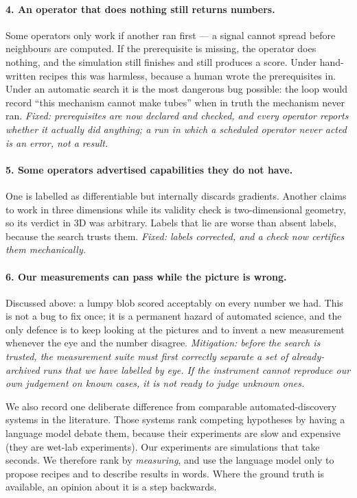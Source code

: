 \documentclass[11pt]{article}
\begin{document}
\paragraph{4. An operator that does nothing still returns numbers.}
Some operators only work if another ran first --- a signal cannot spread before neighbours are
computed. If the prerequisite is missing, the operator does nothing, and the simulation still
finishes and still produces a score. Under hand-written recipes this was harmless, because a
human wrote the prerequisites in. Under an automatic search it is the most dangerous bug
possible: the loop would record ``this mechanism cannot make tubes'' when in truth the mechanism
never ran. \emph{Fixed: prerequisites are now declared and checked, and every operator reports
whether it actually did anything; a run in which a scheduled operator never acted is an error,
not a result.}

\paragraph{5. Some operators advertised capabilities they do not have.}
One is labelled as differentiable but internally discards gradients. Another claims to work in
three dimensions while its validity check is two-dimensional geometry, so its verdict in 3D was
arbitrary. Labels that lie are worse than absent labels, because the search trusts them.
\emph{Fixed: labels corrected, and a check now certifies them mechanically.}

\paragraph{6. Our measurements can pass while the picture is wrong.}
Discussed above: a lumpy blob scored acceptably on every number we had. This is not a bug to fix
once; it is a permanent hazard of automated science, and the only defence is to keep looking at
the pictures and to invent a new measurement whenever the eye and the number disagree.
\emph{Mitigation: before the search is trusted, the measurement suite must first correctly
separate a set of already-archived runs that we have labelled by eye. If the instrument cannot
reproduce our own judgement on known cases, it is not ready to judge unknown ones.}

We also record one deliberate difference from comparable automated-discovery systems in the
literature. Those systems rank competing hypotheses by having a language model debate them,
because their experiments are slow and expensive (they are wet-lab experiments). Our experiments
are simulations that take seconds. We therefore rank by \emph{measuring}, and use the language
model only to propose recipes and to describe results in words. Where the ground truth is
available, an opinion about it is a step backwards.
\end{document}

